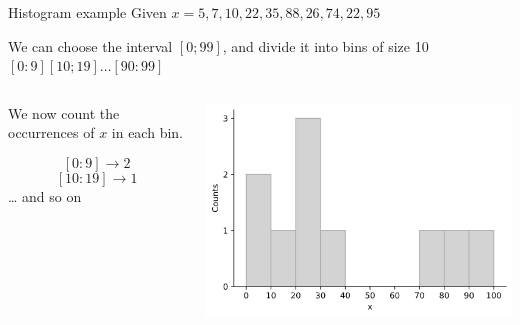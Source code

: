 \documentclass[9pt, aspectratio=169]{beamer}
\begin{document}
\begin{frame}
    {Histogram example}
    Given $x = {5, 7, 10, 22, 35, 88, 26, 74, 22, 95}$

    We can choose the interval $[0; 99]$, and divide it into bins of size 10 $[0:9] [10; 19] \dots [90:99]$
    \pause
    \begin{columns}
        \begin{column}{0.5\textwidth}
            We now count the occurrences of $x$ in each bin.

            $$[0:9] \rightarrow 2$$
            $$[10:19] \rightarrow 1$$
            \dots
            and so on
        \end{column}
        \pause
        \begin{column}{0.5\textwidth}
            \includegraphics[width=\textwidth]{example_histogram.png}


        \end{column}
    \end{columns}
\end{frame}
\end{document}
